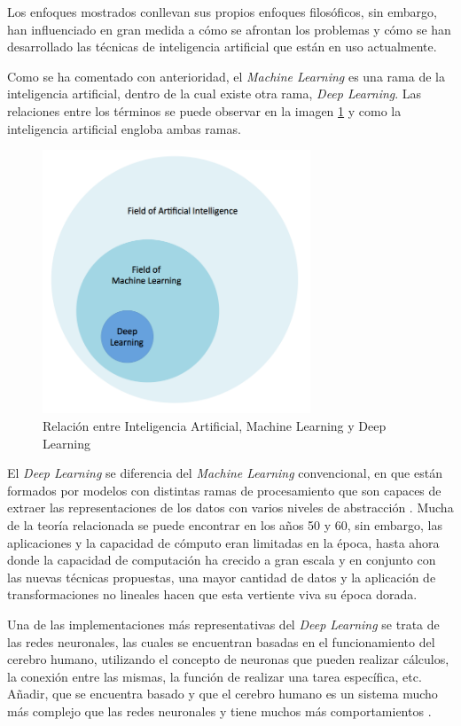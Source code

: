 Los enfoques mostrados conllevan sus propios enfoques filosóficos, sin embargo, han influenciado en gran medida a cómo se afrontan los problemas y cómo se han desarrollado las técnicas de inteligencia artificial que están en uso actualmente.

Como se ha comentado con anterioridad, el \textit{Machine Learning} es una rama de la inteligencia artificial, dentro de la cual existe otra rama, \textit{Deep Learning}. Las relaciones entre los términos se puede observar en la imagen \ref{fig:ai-ml-dl} y como la inteligencia artificial engloba ambas ramas.

\begin{figure}[ht]
	\centering
	\includegraphics[width=8cm]{figs/ai-ml-dl-relationship.png}
	\caption{Relación entre Inteligencia Artificial, Machine Learning y Deep Learning}
	\label{fig:ai-ml-dl}
\end{figure}

El \textit{Deep Learning} se diferencia del \textit{Machine Learning} convencional, en que están formados por modelos con distintas ramas de procesamiento que son capaces de extraer las representaciones de los datos con varios niveles de abstracción \cite{lecun2015deep}. Mucha de la teoría relacionada se puede encontrar en los años 50 y 60, sin embargo, las aplicaciones y la capacidad de cómputo eran limitadas en la época, hasta ahora donde la capacidad de computación ha crecido a gran escala y en conjunto con las nuevas técnicas propuestas, una mayor cantidad de datos y la aplicación de transformaciones no lineales hacen que esta vertiente viva su época dorada.

Una de las implementaciones más representativas del \textit{Deep Learning} se trata de las redes neuronales, las cuales se encuentran basadas en el funcionamiento del cerebro humano, utilizando el concepto de neuronas que pueden realizar cálculos, la conexión entre las mismas, la función de realizar una tarea específica, etc. Añadir, que se encuentra basado y que el cerebro humano es un sistema mucho más complejo que las redes neuronales y tiene muchos más comportamientos \cite{haykin1994neural}.


